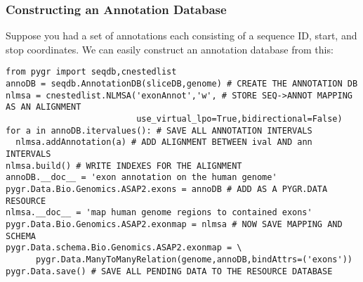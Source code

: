 \documentclass{howto}
\begin{document}
\subsubsection{Constructing an Annotation Database}
Suppose you had a set of annotations  each consisting of a sequence ID,
start, and stop coordinates.  We can easily construct an annotation database
from this:
\begin{verbatim}
from pygr import seqdb,cnestedlist
annoDB = seqdb.AnnotationDB(sliceDB,genome) # CREATE THE ANNOTATION DB
nlmsa = cnestedlist.NLMSA('exonAnnot','w', # STORE SEQ->ANNOT MAPPING AS AN ALIGNMENT
                          use_virtual_lpo=True,bidirectional=False)
for a in annoDB.itervalues(): # SAVE ALL ANNOTATION INTERVALS
  nlmsa.addAnnotation(a) # ADD ALIGNMENT BETWEEN ival AND ann INTERVALS
nlmsa.build() # WRITE INDEXES FOR THE ALIGNMENT
annoDB.__doc__ = 'exon annotation on the human genome'
pygr.Data.Bio.Genomics.ASAP2.exons = annoDB # ADD AS A PYGR.DATA RESOURCE
nlmsa.__doc__ = 'map human genome regions to contained exons'
pygr.Data.Bio.Genomics.ASAP2.exonmap = nlmsa # NOW SAVE MAPPING AND SCHEMA
pygr.Data.schema.Bio.Genomics.ASAP2.exonmap = \
      pygr.Data.ManyToManyRelation(genome,annoDB,bindAttrs=('exons'))
pygr.Data.save() # SAVE ALL PENDING DATA TO THE RESOURCE DATABASE
\end{verbatim}
\end{document}
